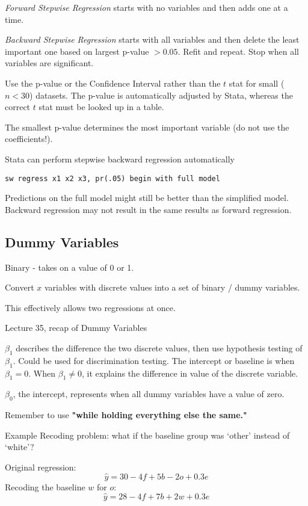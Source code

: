 \documentclass[11pt, oneside]{article}   	%
\begin{document}
\textit{Forward Stepwise Regression} starts with no variables and then adds one at a time.

\textit{Backward Stepwise Regression} starts with all variables and then delete the least important one based on largest p-value $> 0.05$. Refit and repeat. Stop when all variables are significant.

Use the p-value or the Confidence Interval rather than the $t$ stat for small ($n < 30$) datasets. The p-value is automatically adjusted by Stata, whereas the correct $t$ stat must be looked up in a table.

The smallest p-value determines the most important variable (do not use the coefficients!).

Stata can perform stepwise backward regression automatically
\begin{verbatim}
sw regress x1 x2 x3, pr(.05) begin with full model
\end{verbatim}

Predictions on the full model might still be better than the simplified model. Backward regression may not result in the same results as forward regression.

\subsection{Dummy Variables}

Binary - takes on a value of 0 or 1.

Convert $x$ variables with discrete values into a set of binary / dummy variables.

This effectively allows two regressions at once.

Lecture 35, recap of Dummy Variables

$\beta_1$ describes the difference the two discrete values, then use hypothesis testing of $\beta_1$. Could be used for discrimination testing. The intercept or baseline is when $\beta_1 = 0$. When $\beta_1 \neq 0$, it explains the difference in value of the discrete variable.

$\beta_0$, the intercept, represents when all dummy variables have a value of zero.

Remember to use \textbf{"while holding everything else the same."}

Example Recoding problem: what if the baseline group was `other' instead of `white'? 

Original regression:
\[
\hat{y} = 30 -4 f + 5 b - 2 o + 0.3 e
\]
Recoding the baseline $w$ for $o$:
\[
\hat{y} = 28 -4 f + 7 b + 2 w + 0.3 e
\]
\end{document}

